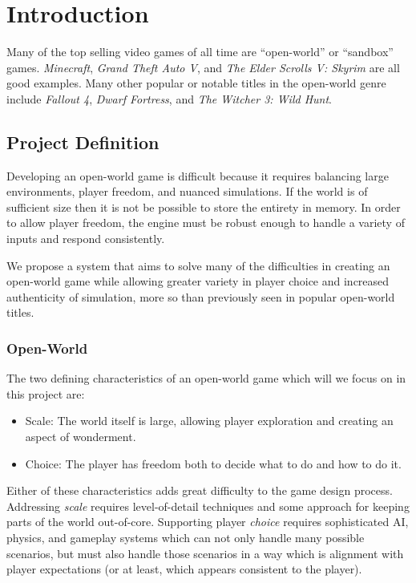 
\chapter{Introduction}

Many of the top selling video games of all time are ``open-world'' or ``sandbox'' games. {\em Minecraft}, {\em Grand Theft Auto V}, and {\em The Elder Scrolls V: Skyrim} are all good examples. Many other popular or notable titles in the open-world genre include {\em Fallout 4}, {\em Dwarf Fortress}, and {\em The Witcher 3: Wild Hunt}.

\section{Project Definition}

Developing an open-world game is difficult because it requires balancing large environments, player freedom, and nuanced simulations. If the world is of sufficient size then it is not be possible to store the entirety in memory. In order to allow player freedom, the engine must be robust enough to handle a variety of inputs and respond consistently.

We propose a system that aims to solve many of the difficulties in creating an open-world game while allowing greater variety in player choice and increased authenticity of simulation, more so than previously seen in popular open-world titles.

\subsection{Open-World}

The two defining characteristics of an open-world game which will we focus on in this project are:

\begin{itemize}
  \item Scale: The world itself is large, allowing player exploration and creating an aspect of wonderment.
  \item Choice: The player has freedom both to decide what to do and how to do it.
\end{itemize}

Either of these characteristics adds great difficulty to the game design process. Addressing {\em scale} requires level-of-detail techniques and some approach for keeping parts of the world out-of-core. Supporting player {\em choice} requires sophisticated AI, physics, and gameplay systems which can not only handle many possible scenarios, but must also handle those scenarios in a way which is alignment with player expectations (or at least, which appears consistent to the player).


